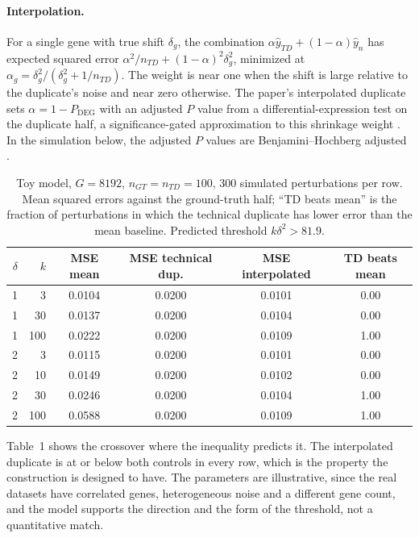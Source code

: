 \documentclass[11pt]{article}
\theoremstyle{definition}
\begin{document}
\paragraph{Interpolation.} For a single gene with true shift $\delta_g$, the combination $\alpha\hat y_{TD}+(1-\alpha)\hat y_n$ has expected squared error $\alpha^2/n_{TD}+(1-\alpha)^2\delta_g^2$, minimized at $\alpha_g=\delta_g^2/(\delta_g^2+1/n_{TD})$. The weight is near one when the shift is large relative to the duplicate's noise and near zero otherwise. The paper's interpolated duplicate sets $\alpha=1-P_{\mathrm{DEG}}$ with an adjusted $P$ value from a differential-expression test on the duplicate half, a significance-gated approximation to this shrinkage weight \citep{miller2026}. In the simulation below, the adjusted $P$ values are Benjamini--Hochberg adjusted \citep{bh1995}.

\begin{table}[t]
\centering
\caption{Toy model, $G=8192$, $n_{GT}=n_{TD}=100$, 300 simulated perturbations per row. Mean squared errors against the ground-truth half; ``TD beats mean'' is the fraction of perturbations in which the technical duplicate has lower error than the mean baseline. Predicted threshold $k\delta^2>81.9$.}
\begin{tabular}{rrcccc}
\toprule
$\delta$ & $k$ & MSE mean & MSE technical dup. & MSE interpolated & TD beats mean \\
\midrule
1 & 3    & 0.0104 & 0.0200 & 0.0101 & 0.00 \\
1 & 30   & 0.0137 & 0.0200 & 0.0104 & 0.00 \\
1 & 100  & 0.0222 & 0.0200 & 0.0109 & 1.00 \\
2 & 3    & 0.0115 & 0.0200 & 0.0101 & 0.00 \\
2 & 10   & 0.0149 & 0.0200 & 0.0102 & 0.00 \\
2 & 30   & 0.0246 & 0.0200 & 0.0104 & 1.00 \\
2 & 100  & 0.0588 & 0.0200 & 0.0109 & 1.00 \\
\bottomrule
\end{tabular}
\end{table}

Table~1 shows the crossover where the inequality predicts it. The interpolated duplicate is at or below both controls in every row, which is the property the construction is designed to have. The parameters are illustrative, since the real datasets have correlated genes, heterogeneous noise and a different gene count, and the model supports the direction and the form of the threshold, not a quantitative match.
\end{document}
